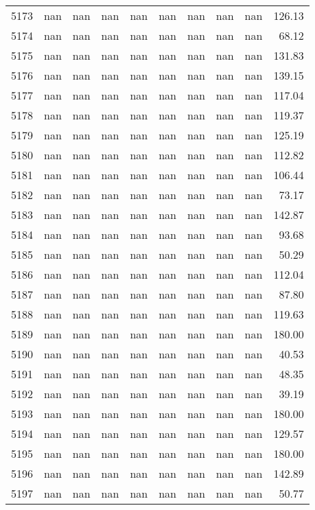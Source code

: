 \begin{tabular}{lrrrrrrrrr}
5173 & nan & nan & nan & nan & nan & nan & nan & nan & 126.13 \\
5174 & nan & nan & nan & nan & nan & nan & nan & nan & 68.12 \\
5175 & nan & nan & nan & nan & nan & nan & nan & nan & 131.83 \\
5176 & nan & nan & nan & nan & nan & nan & nan & nan & 139.15 \\
5177 & nan & nan & nan & nan & nan & nan & nan & nan & 117.04 \\
5178 & nan & nan & nan & nan & nan & nan & nan & nan & 119.37 \\
5179 & nan & nan & nan & nan & nan & nan & nan & nan & 125.19 \\
5180 & nan & nan & nan & nan & nan & nan & nan & nan & 112.82 \\
5181 & nan & nan & nan & nan & nan & nan & nan & nan & 106.44 \\
5182 & nan & nan & nan & nan & nan & nan & nan & nan & 73.17 \\
5183 & nan & nan & nan & nan & nan & nan & nan & nan & 142.87 \\
5184 & nan & nan & nan & nan & nan & nan & nan & nan & 93.68 \\
5185 & nan & nan & nan & nan & nan & nan & nan & nan & 50.29 \\
5186 & nan & nan & nan & nan & nan & nan & nan & nan & 112.04 \\
5187 & nan & nan & nan & nan & nan & nan & nan & nan & 87.80 \\
5188 & nan & nan & nan & nan & nan & nan & nan & nan & 119.63 \\
5189 & nan & nan & nan & nan & nan & nan & nan & nan & 180.00 \\
5190 & nan & nan & nan & nan & nan & nan & nan & nan & 40.53 \\
5191 & nan & nan & nan & nan & nan & nan & nan & nan & 48.35 \\
5192 & nan & nan & nan & nan & nan & nan & nan & nan & 39.19 \\
5193 & nan & nan & nan & nan & nan & nan & nan & nan & 180.00 \\
5194 & nan & nan & nan & nan & nan & nan & nan & nan & 129.57 \\
5195 & nan & nan & nan & nan & nan & nan & nan & nan & 180.00 \\
5196 & nan & nan & nan & nan & nan & nan & nan & nan & 142.89 \\
5197 & nan & nan & nan & nan & nan & nan & nan & nan & 50.77 \\

\end{tabular}
